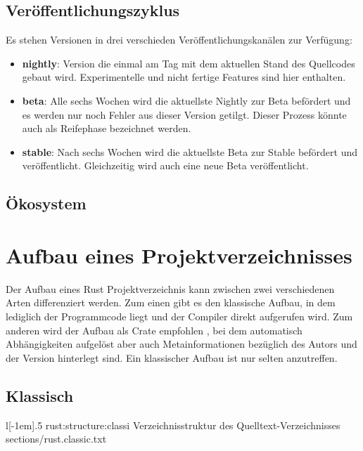 \subsection{Veröffentlichungszyklus}

Es stehen Versionen in drei verschieden Veröffentlichungskanälen zur Verfügung:
\begin{itemize}
	\item \textbf{nightly}: Version die einmal am Tag mit dem aktuellen Stand des Quellcodes gebaut wird. Experimentelle und nicht fertige Features sind hier enthalten.
	\item \textbf{beta}: Alle sechs Wochen wird die aktuellste Nightly zur Beta befördert und es werden nur noch Fehler aus dieser Version getilgt.
	Dieser Prozess könnte auch als Reifephase bezeichnet werden.
	\item \textbf{stable}: Nach sechs Wochen wird die aktuellste Beta zur Stable befördert und veröffentlicht.
	Gleichzeitig wird auch eine neue Beta veröffentlicht.
\end{itemize}

\subsection{Ökosystem}





\section{Aufbau eines Projektverzeichnisses}

Der Aufbau eines Rust Projektverzeichnis kann zwischen zwei verschiedenen Arten differenziert werden.
Zum einen gibt es den klassische Aufbau, in dem lediglich der Programmcode liegt und der Compiler direkt aufgerufen wird.
Zum anderen wird der Aufbau als Crate empfohlen , bei dem automatisch Abhängigkeiten aufgelöst aber auch Metainformationen bezüglich des Autors und der Version hinterlegt sind.
Ein klassischer Aufbau ist nur selten anzutreffen.


\subsection{Klassisch}
\label{rust:structure:classic}
\begin{wrapfigure}{l}[-1em]{.5\textwidth}
	\rustcinclude
		{rust:structure:classi}
		{Verzeichnisstruktur des Quelltext-Verzeichnisses}
		{sections/rust.classic.txt}
\end{wrapfigure}


